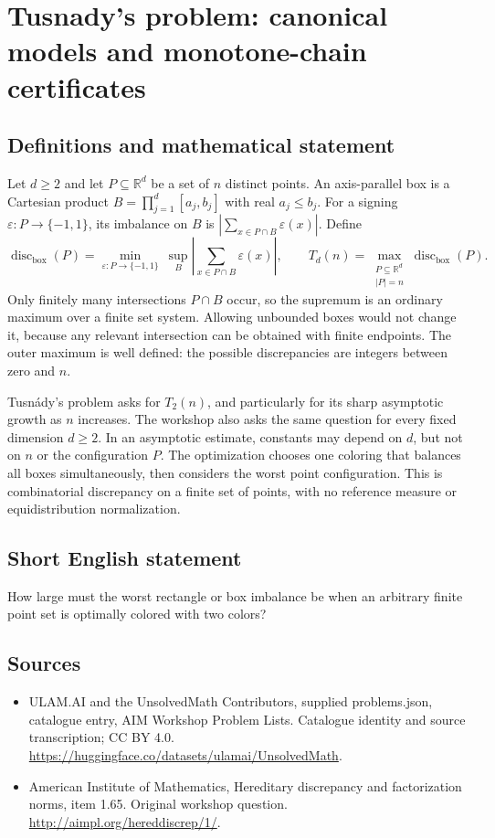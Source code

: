 \documentclass[11pt,a4paper]{article}
\begin{document}
\section*{Tusnady's problem: canonical models and monotone-chain certificates}\label{statement}

\subsection{Definitions and mathematical statement}
Let $d\ge2$ and let $P\subseteq\mathbb R^d$ be a set of $n$ distinct
points. An axis-parallel box is a Cartesian product
$B=\prod_{j=1}^d[a_j,b_j]$ with real $a_j\le b_j$.
For a signing $\varepsilon:P\to\{-1,1\}$, its imbalance on $B$ is
$|\sum_{x\in P\cap B}\varepsilon(x)|$. Define
\[
 \operatorname{disc}_{\mathrm{box}}(P)=
 \min_{\varepsilon:P\to\{-1,1\}}\ \sup_{B}
 \left|\sum_{x\in P\cap B}\varepsilon(x)\right|,
 \qquad
 T_d(n)=\max_{\substack{P\subseteq\mathbb R^d\\|P|=n}}
             \operatorname{disc}_{\mathrm{box}}(P).
\]
Only finitely many intersections $P\cap B$ occur, so the supremum is
an ordinary maximum over a finite set system. Allowing unbounded boxes
would not change it, because any relevant intersection can be obtained
with finite endpoints. The outer maximum is well defined: the possible
discrepancies are integers between zero and $n$.

Tusn\'ady's problem asks for $T_2(n)$, and particularly for its sharp
asymptotic growth as $n$ increases. The workshop also asks the same
question for every fixed dimension $d\ge2$. In an asymptotic estimate,
constants may depend on $d$, but not on $n$ or the configuration $P$.
The optimization chooses one coloring that balances all boxes
simultaneously, then considers the worst point configuration. This is
combinatorial discrepancy on a finite set of points, with no reference
measure or equidistribution normalization.
\subsection{Short English statement}
How large must the worst rectangle or box imbalance be when an arbitrary finite point set is optimally colored with two colors?
\subsection{Sources}
\begin{itemize}
\item[S1] ULAM.AI and the UnsolvedMath Contributors, supplied problems.json, catalogue entry, AIM Workshop Problem Lists. Catalogue identity and source transcription; CC BY 4.0.
\url{https://huggingface.co/datasets/ulamai/UnsolvedMath}.
\item[S2] American Institute of Mathematics, Hereditary discrepancy and factorization norms, item 1.65. Original workshop question.
\url{http://aimpl.org/hereddiscrep/1/}.
\end{itemize}
\end{document}
